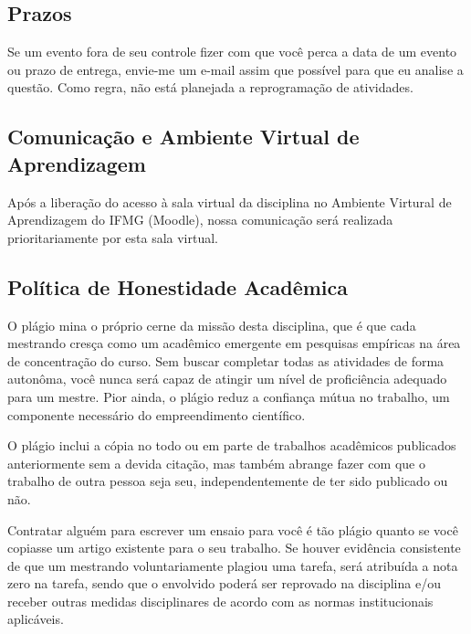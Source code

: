 \documentclass[11pt,]{article}
\begin{document}
\hypertarget{prazos}{%
\subsection{Prazos}\label{prazos}}

Se um evento fora de seu controle fizer com que você perca a data de um
evento ou prazo de entrega, envie-me um e-mail assim que possível para
que eu analise a questão. Como regra, não está planejada a reprogramação
de atividades.

\hypertarget{comunicauxe7uxe3o-e-ambiente-virtual-de-aprendizagem}{%
\subsection{Comunicação e Ambiente Virtual de
Aprendizagem}\label{comunicauxe7uxe3o-e-ambiente-virtual-de-aprendizagem}}

Após a liberação do acesso à sala virtual da disciplina no Ambiente
Virtural de Aprendizagem do IFMG (Moodle), nossa comunicação será
realizada prioritariamente por esta sala virtual.

\hypertarget{poluxedtica-de-honestidade-acaduxeamica}{%
\subsection{Política de Honestidade
Acadêmica}\label{poluxedtica-de-honestidade-acaduxeamica}}

O plágio mina o próprio cerne da missão desta disciplina, que é que cada
mestrando cresça como um acadêmico emergente em pesquisas empíricas na
área de concentração do curso. Sem buscar completar todas as atividades
de forma autonôma, você nunca será capaz de atingir um nível de
proficiência adequado para um mestre. Pior ainda, o plágio reduz a
confiança mútua no trabalho, um componente necessário do empreendimento
científico.

O plágio inclui a cópia no todo ou em parte de trabalhos acadêmicos
publicados anteriormente sem a devida citação, mas também abrange fazer
com que o trabalho de outra pessoa seja seu, independentemente de ter
sido publicado ou não.

Contratar alguém para escrever um ensaio para você é tão plágio quanto
se você copiasse um artigo existente para o seu trabalho. Se houver
evidência consistente de que um mestrando voluntariamente plagiou uma
tarefa, será atribuída a nota zero na tarefa, sendo que o envolvido
poderá ser reprovado na disciplina e/ou receber outras medidas
disciplinares de acordo com as normas institucionais aplicáveis.
\end{document}
